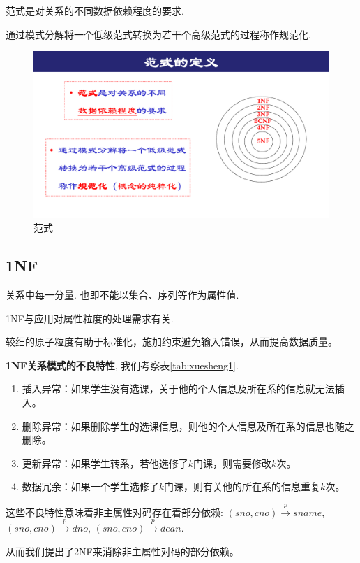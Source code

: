 \begin{definition}[范式]
  范式是对关系的不同数据依赖程度的要求.
\end{definition}

\begin{definition}[规范化]
  通过模式分解将一个低级范式转换为若干个高级范式的过程称作规范化.
\end{definition}

\begin{figure}[H]
    \centering
    \includegraphics[width=.25\textwidth]{./figure/范式.pdf}
    \caption{范式}
\end{figure}

\subsection{1NF}

\begin{definition}[1NF]
  关系中每一分量. 也即不能以集合、序列等作为属性值.
\end{definition}

\begin{remark}
  1NF与应用对属性粒度的处理需求有关.

  较细的原子粒度有助于标准化，施加约束避免输入错误，从而提高数据质量。
\end{remark}

\textbf{1NF关系模式的不良特性}, 我们考察表\ref{tab:xuesheng1}.
\begin{enumerate}
    \item 插入异常：如果学生没有选课，关于他的个人信息及所在系的信息就无法插入。
    \item 删除异常：如果删除学生的选课信息，则他的个人信息及所在系的信息也随之删除。
    \item 更新异常：如果学生转系，若他选修了$k$门课，则需要修改$k$次。
    \item 数据冗余：如果一个学生选修了$k$门课，则有关他的所在系的信息重复$k$次。
\end{enumerate}
这些不良特性意味着非主属性对码存在着部分依赖: $(sno,cno)\overset{p}{\rightarrow} sname$, $(sno,cno)\overset{p}{\rightarrow} dno$, $(sno,cno)\overset{p}{\rightarrow} dean$.

从而我们提出了2NF来消除非主属性对码的部分依赖。

